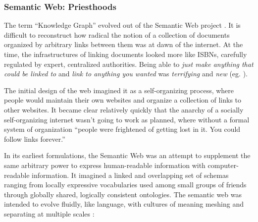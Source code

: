 \hypertarget{semantic-web-priesthoods}{%
\subsubsection{Semantic Web:
Priesthoods}\label{semantic-web-priesthoods}}

The term ``Knowledge Graph'' evolved out of the Semantic Web project
\cite{hitzlerReviewSemanticWeb2021} . It is difficult to
reconstruct how radical the notion of a collection of documents
organized by arbitrary links between them was at dawn of the internet.
At the time, the infrastructures of linking documents looked more like
ISBNs, carefully regulated by expert, centralized
authorities. Being able to
\emph{just make anything that could be linked to} and \emph{link to
anything you wanted} was \emph{terrifying} and \emph{new} (eg. \cite{berners-leeLinksLaw1997, berners-leeLinksLawMyths1997} ).

The initial design of the web imagined it as a self-organizing process,
where people would maintain their own websites and organize a collection
of links to other websites. It became clear relatively quickly that the
anarchy of a socially self-organizing internet wasn't going to work as
planned, where without a formal system of organization ``people were
frightened of getting lost in it. You could follow links forever.'' \cite{berners-leeWhatSemanticWeb1998} 

In its earliest formulations, the Semantic Web was an attempt to
supplement the same arbitrary power to express human-readable
information with computer-readable information. It imagined a linked and
overlapping set of schemas ranging from locally expressive vocabularies
used among small groups of friends through globally shared, logically
consistent ontologies. The semantic web was intended to evolve fluidly,
like language, with cultures of meaning meshing and separating at
multiple scales \cite{berners-leeScalefreeNatureWeb1998, berners-leeSemanticWeb2001, berners-leeCulturesBoundaries2007} :

